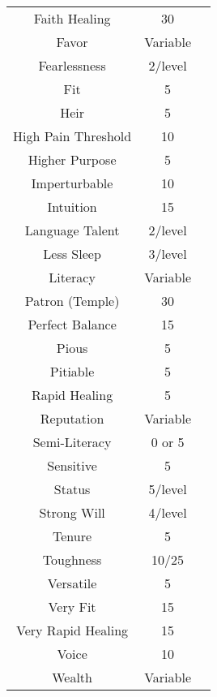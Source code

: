 \begin{center}
\begin{supertabular}{|c|c|c|}
Faith Healing & 30 & \cite[p.36]{CI} \\
Favor & Variable & \cite[p.25]{CI} \\
Fearlessness & 2/level & \cite[p.25]{CI} \\
Fit & 5 & \cite[p.25]{CI} \\
Heir & 5 & \cite[p.25]{CI} \\
High Pain Threshold & 10 & \cite[p.20]{B} \\
Higher Purpose & 5 & \cite[p.26]{CI} \\
Imperturbable & 10 & \cite[p.26]{CI} \\
Intuition & 15 & \cite[p.20]{B} \\
Language Talent & 2/level & \cite[p.20]{B} \\
Less Sleep & 3/level & \cite[p.27]{CI} \\
Literacy & Variable & \cite[p.21]{B} \\
Patron (Temple) & 30 & \cite[p.24]{B} \\
Perfect Balance & 15 & \cite[p.63]{CI} \\
Pious & 5 & \cite[p.29]{CI} \\
Pitiable & 5 & \cite[p.29]{CI} \\
Rapid Healing & 5 & \cite[p.22]{B} \\
Reputation & Variable & \cite[p.17]{B} \\
Semi-Literacy & 0 or 5 & \cite[p.29]{CI} \\
Sensitive & 5 & \cite[p.30]{CI} \\
Status & 5/level & \cite[p.18]{B} \\
Strong Will & 4/level & \cite[p.23]{B} \\
Tenure & 5 & \cite[p.31]{CI} \\
Toughness & 10/25 & \cite[p.23]{B} \\
Versatile & 5 & \cite[p.31]{CI} \\
Very Fit & 15 & \cite[p.31]{CI} \\
Very Rapid Healing & 15 & \cite[p.31]{CI} \\
Voice & 10 & \cite[p.23]{B} \\
Wealth & Variable & \cite[p.16]{B} \\
\hline 

\end{supertabular}
\end{center}

